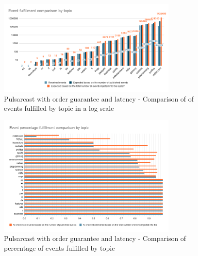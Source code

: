 \begin{figure}[!htb]
  \centering
  \includegraphics[width=0.8\textwidth]{img/graph-pulsarcast-order-latency-event-fulfillment-comparison.png}
  \caption{Pulsarcast with order guarantee and latency - Comparison of of events fulfilled by topic in a log scale}
  \label{fig:graph-pulsarcast-order-latency-event-fulfillment-comparison}
\end{figure}

\begin{figure}[!htb]
  \centering
  \includegraphics[width=0.8\textwidth]{img/graph-pulsarcast-order-latency-event-percentage-fulfillment-comparison.png}
  \caption{Pulsarcast with order guarantee and latency - Comparison of percentage of events fulfilled by topic}
  \label{fig:graph-pulsarcast-order-latency-event-percentage-fulfillment-comparison}
\end{figure}

